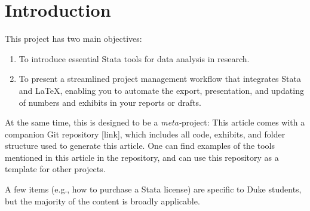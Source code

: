 
\section{Introduction} 
\label{sec_intro}
This project has two main objectives:
\begin{enumerate}
\item To introduce essential Stata tools for data analysis in research.
\item To present a streamlined project management workflow that integrates Stata and \LaTeX, enabling you to automate the export, presentation, and updating of numbers and exhibits in your reports or drafts.
\end{enumerate}

At the same time, this is designed to be a \textit{meta-}project: This article comes with a companion Git repository [link], which includes all code, exhibits, and folder structure used to generate this article. One can find examples of the tools mentioned in this article in the repository, and can use this repository as a template for other projects. 

A few items (e.g., how to purchase a Stata license) are specific to Duke students, but the majority of the content is broadly applicable.